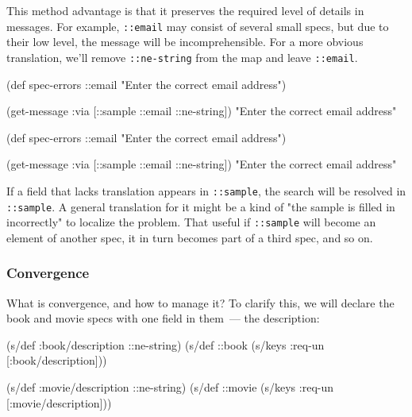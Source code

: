 This method advantage is that it preserves the required level of details in messages. For example, \verb|::email| may consist of several small specs, but due to their low level, the message will be incomprehensible. For a more obvious translation, we'll remove \verb|::ne-string| from the map and leave \verb|::email|.

\ifx\DEVICETYPE\MOBILE

  \begin{clojure}
(def spec-errors
  {::email
   "Enter the correct email address"})

(get-message
  {:via [::sample ::email ::ne-string]})
"Enter the correct email address"
  \end{clojure}

\else

  \begin{clojure}
(def spec-errors
  {::email "Enter the correct email address"})

(get-message {:via [::sample ::email ::ne-string]})
"Enter the correct email address"
  \end{clojure}

\fi

If a field that lacks translation appears in \verb|::sample|, the search will be resolved in \verb|::sample|. A general translation for it might be a kind of "the sample is filled in incorrectly" to localize the problem. That useful if \verb|::sample| will become an element of another spec, it in turn becomes part of a third spec, and so on.

\subsubsection{Convergence}

What is convergence, and how to manage it? To clarify this, we will declare the book and movie specs with one field in them~--- the description:

\ifx\DEVICETYPE\MOBILE

\begin{english}
  \begin{clojure}
(s/def :book/description ::ne-string)
(s/def ::book
  (s/keys :req-un [:book/description]))

(s/def :movie/description ::ne-string)
(s/def ::movie
  (s/keys :req-un [:movie/description]))
  \end{clojure}
\end{english}

